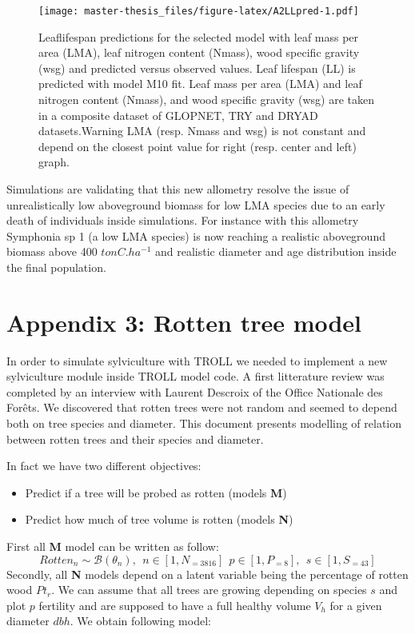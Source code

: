 \documentclass[12pt,]{article}
\providecommand{\tightlist}{%
\setlength{\itemsep}{0pt}\setlength{\parskip}{0pt}}
\let\oldsection\section
\renewcommand\section{\newpage\oldsection}
\theoremstyle{definition}
\theoremstyle{definition}
\theoremstyle{remark}
\begin{document}
\begin{figure}[htbp]
\centering
\texttt{[image: master-thesis\_files/figure-latex/A2LLpred-1.pdf]}
\caption{\label{fig:A2LLpred}Leaflifespan predictions for the selected model
with leaf mass per area (LMA), leaf nitrogen content (Nmass), wood
specific gravity (wsg) and predicted versus observed values. Leaf
lifespan (LL) is predicted with model M10 fit. Leaf mass per area (LMA)
and leaf nitrogen content (Nmass), and wood specific gravity (wsg) are
taken in a composite dataset of GLOPNET, TRY and DRYAD datasets.Warning
LMA (resp. Nmass and wsg) is not constant and depend on the closest
point value for right (resp. center and left) graph.}
\end{figure}

Simulations are validating that this new allometry resolve the issue of
unrealistically low aboveground biomass for low LMA species due to an
early death of individuals inside simulations. For instance with this
allometry Symphonia sp 1 (a low LMA species) is now reaching a realistic
aboveground biomass above 400 \(tonC.ha^{-1}\) and realistic diameter
and age distribution inside the final population.

\hypertarget{appendix-3-rotten-tree-model}{\section{Appendix 3: Rotten
tree model}\label{appendix-3-rotten-tree-model}}

In order to simulate sylviculture with TROLL we needed to implement a
new sylviculture module inside TROLL model code. A first litterature
review was completed by an interview with Laurent Descroix of the Office
Nationale des Forêts. We discovered that rotten trees were not random
and seemed to depend both on tree species and diameter. This document
presents modelling of relation between rotten trees and their species
and diameter.

In fact we have two different objectives:

\begin{itemize}
\tightlist
\item
  Predict if a tree will be probed as rotten (models \textbf{M})
\item
  Predict how much of tree volume is rotten (models \textbf{N})
\end{itemize}

First all \textbf{M} model can be written as follow:
\[Rotten_n \sim \mathcal{B}(\theta_n), ~~n \in [1,N_{=3816}] ~~ p \in [1, P_{=8}], ~~ s \in [1, S_{=43}]\]
Secondly, all \textbf{N} models depend on a latent variable being the
percentage of rotten wood \(Pt_r\). We can assume that all trees are
growing depending on species \(s\) and plot \(p\) fertility and are
supposed to have a full healthy volume \(V_h\) for a given diameter
\(dbh\). We obtain following model:
\end{document}
